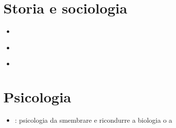 \documentclass[letterpaper,10pt,italian]{jupyterBook}
\begin{document}
\section{Storia e sociologia}
\label{\detokenize{ch/topics:storia-e-sociologia}}\begin{itemize}
\item {} 
\sphinxAtStartPar
{}

\item {} 
\sphinxAtStartPar
{\hyperref[\detokenize{ch/history:pc-saint-simon}]{}}

\item {} 
\sphinxAtStartPar
{\hyperref[\detokenize{ch/history:pc-comte}]{}}

\end{itemize}


\section{Psicologia}
\label{\detokenize{ch/topics:psicologia}}\begin{itemize}
\item {} 
\sphinxAtStartPar
{\hyperref[\detokenize{ch/history:pc-comte}]{}}: psicologia da smembrare e ricondurre a biologia o a 

\end{itemize}







\renewcommand{\indexname}{Indice}
\printindex
\end{document}

